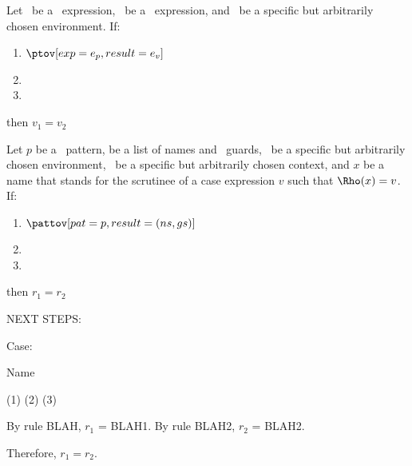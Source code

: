 \documentclass[]{article}
\begin{document}
Let \ep\ be a \PPlus\ expression, \ev\ be a \VMinus\ expression, and \Rho\ be a
specific but arbitrarily chosen environment. If: 
\begin{enumerate}
    \item $\ptov[exp=\ep,result=\ev]$
    \item \prun[exp=\ep, value=v_{1}]
    \item \vmrung[guard=\ev, result=v_{2}]
\end{enumerate}

then $v_{1} = v_{2}$


Let $p$ be a \PPlus\ pattern, \nsgs be a list of names and \VMinus\ guards,
\Rho\ be a specific but arbitrarily chosen environment, \context\ be a specific
but arbitrarily chosen context, and $x$ be a name that stands for the scrutinee
of a case expression $v$ such that $\Rho(x) = v$. If: 
\begin{enumerate}
    \item $\pattov[pat=p, result=\nsgs]$
    \item \pmatch[newenv=r_{1}]
    \item \vmgs[envext={\bracketed{\forall n \in ns, n \mapsto
    \bot}},result=r_{2}] 
\end{enumerate}

then $r_{1} = r_{2}$

NEXT STEPS:


Case: 

Name 

(1) \pattov[pat=y, result={(y, [x = y])}] (2) \pmatch[pat=y, newenv=r_{1}] (3) \vmgs[envext=\bracketed{y \mapsto \rho(x)}, guards={[x = y]}, result=r_{2}]

By rule BLAH, $r_{1}$ = BLAH1. 
By rule BLAH2, $r_{2}$ = BLAH2. 

Therefore, $r_{1} = r_{2}$. 

\vmsemantics
\end{document}

